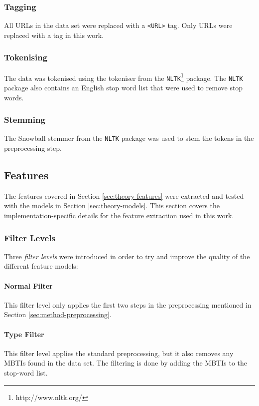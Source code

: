 \subsubsection{Tagging}
All URLs in the data set were replaced with a \texttt{<URL>} tag.
Only URLs were replaced with a tag in this work.

\subsubsection{Tokenising}
The data was tokenised using the tokeniser from the \texttt{NLTK}\footnote{http://www.nltk.org/} package.
The \texttt{NLTK} package also contains an English stop word list that were used to remove stop words.

\subsubsection{Stemming}
The Snowball stemmer from the \texttt{NLTK} package was used to stem the tokens in the preprocessing step. 

\subsection{Features}

The features covered in Section \ref{sec:theory-features} were extracted and tested with the models in Section \ref{sec:theory-models}.
This section covers the implementation-specific details for the feature extraction used in this work.

\subsubsection{Filter Levels} \label{sec:method-filter-levels}
Three \emph{filter levels} were introduced in order to try and improve the quality of the different feature models:

\paragraph{Normal Filter} \label{sec:method-normal-filter}
This filter level only applies the first two steps in the preprocessing mentioned in Section \ref{sec:method-preprocessing}.

\paragraph{Type Filter} \label{sec:method-type-filter}
This filter level applies the standard preprocessing, but it also removes any MBTIs found in the data set.
The filtering is done by adding the MBTIs to the stop-word list.

